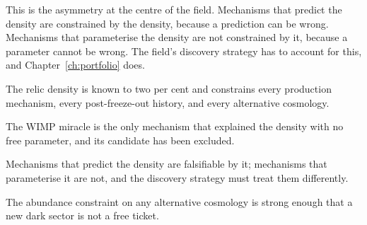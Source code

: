 This is the asymmetry at the centre of the field. Mechanisms that predict
the density are constrained by the density, because a prediction can be
wrong. Mechanisms that parameterise the density are not constrained by it,
because a parameter cannot be wrong. The field's discovery strategy has to
account for this, and Chapter~\ref{ch:portfolio} does.

\begin{keytakeaways}
\item The relic density is known to two per cent and constrains every
production mechanism, every post-freeze-out history, and every alternative
cosmology.
\item The WIMP miracle is the only mechanism that explained the density with
no free parameter, and its candidate has been excluded.
\item Mechanisms that predict the density are falsifiable by it; mechanisms
that parameterise it are not, and the discovery strategy must treat them
differently.
\item The abundance constraint on any alternative cosmology is strong enough
that a new dark sector is not a free ticket.
\end{keytakeaways}
